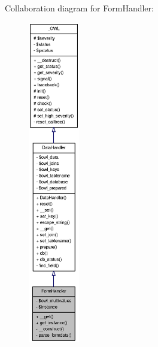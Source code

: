 Collaboration diagram for FormHandler:\nopagebreak
\begin{figure}[H]
\begin{center}
\leavevmode
\includegraphics[height=400pt]{classFormHandler__coll__graph}
\end{center}
\end{figure}
